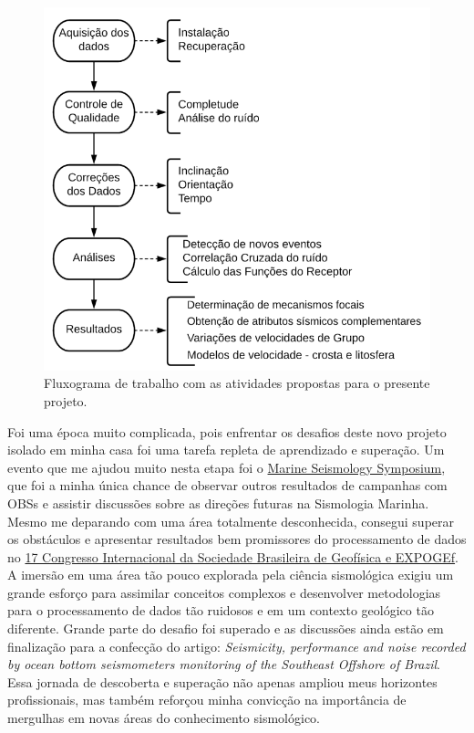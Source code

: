 \documentclass[10pt,a4paper,oneside]{book}
\begin{document}
\begin{figure}[h!]
  \begin{center}
    \includegraphics[width=\textwidth]{images/fluxograma_posdoc_ufsc.png}
  \end{center}
  \caption{Fluxograma de trabalho com as atividades propostas para o presente projeto.}
  \label{fluxo_posdoc_ufsc}
\end{figure}

Foi uma época muito complicada, pois enfrentar os desafios deste novo projeto isolado em minha casa foi uma tarefa repleta de aprendizado e superação. Um evento que me ajudou muito nesta etapa foi o \href{https://www.iris.edu/hq/workshops/2021/03/mss}{Marine Seismology Symposium}, que foi a minha única chance de observar outros resultados de campanhas com OBSs e assistir discussões sobre as direções futuras na Sismologia Marinha. Mesmo me deparando com uma área totalmente desconhecida, consegui superar os obstáculos e apresentar resultados bem promissores do processamento de dados no \href{https://sbgf.org.br/17th_cisbgf/}{17 Congresso Internacional da Sociedade Brasileira de Geofísica e EXPOGEf}. A imersão em uma área tão pouco explorada pela ciência sismológica exigiu um grande esforço para assimilar conceitos complexos e desenvolver metodologias para o processamento de dados tão ruidosos e em um contexto geológico tão diferente. Grande parte do desafio foi superado e as discussões ainda estão em finalização para a confecção do artigo: \textit{Seismicity, performance and noise recorded by ocean bottom seismometers monitoring of the Southeast Offshore of Brazil}. Essa jornada de descoberta e superação não apenas ampliou meus horizontes profissionais, mas também reforçou minha convicção na importância de mergulhas em novas áreas do conhecimento sismológico.
\end{document}
